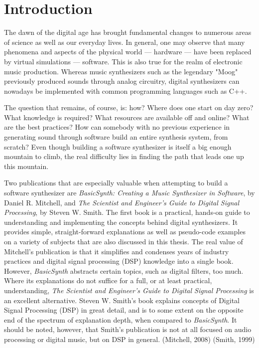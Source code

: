 \chapter*{Introduction}

The dawn of the digital age has brought fundamental changes to numerous areas of science as well as our everyday lives. In general, one may observe that many phenomena and aspects of the physical world --- hardware --- have been replaced by virtual simulations --- software. This is also true for the realm of electronic music production. Whereas music synthesizers such as the legendary "Moog" previously produced sounds through analog circuitry, digital synthesizers can nowadays be implemented with common programming languages such as C++. \vspace{\baselineskip}

The question that remains, of course, is: how? Where does one start on day zero? What knowledge is required? What resources are available off and online? What are the best practices? How can somebody with no previous experience in generating sound through software build an entire synthesis system, from scratch? Even though building a software synthesizer is itself a big enough mountain to climb, the real difficulty lies in finding the path that leads one up this mountain. \vspace{\baselineskip}

Two publications that are especially valuable when attempting to build a software synthesizer are \emph{BasicSynth: Creating a Music Synthesizer in Software}, by Daniel R. Mitchell, and \emph{The Scientist and Engineer's Guide to Digital Signal Processing}, by Steven W. Smith. The first book is a practical, hands-on guide to understanding and implementing the concepts behind digital synthesizers. It provides simple, straight-forward explanations as well as pseudo-code examples on a variety of subjects that are also discussed in this thesis. The real value of Mitchell's publication is that it simplifies and condenses years of industry practices and digital signal processing (DSP) knowledge into a single book. However, \emph{BasicSynth} abstracts certain topics, such as digital filters, too much. Where its explanations do not suffice for a full, or at least practical, understanding, \emph{The Scientist and Engineer's Guide to Digital Signal Processing} is an excellent alternative. Steven W. Smith's book explains concepts of Digital Signal Processing (DSP) in great detail, and is to some extent on the opposite end of the spectrum of explanation depth, when compared to \emph{BasicSynth}. It should be noted, however, that Smith's publication is not at all focused on audio processing or digital music, but on DSP in general. (Mitchell, 2008) (Smith, 1999) \vspace{\baselineskip}

